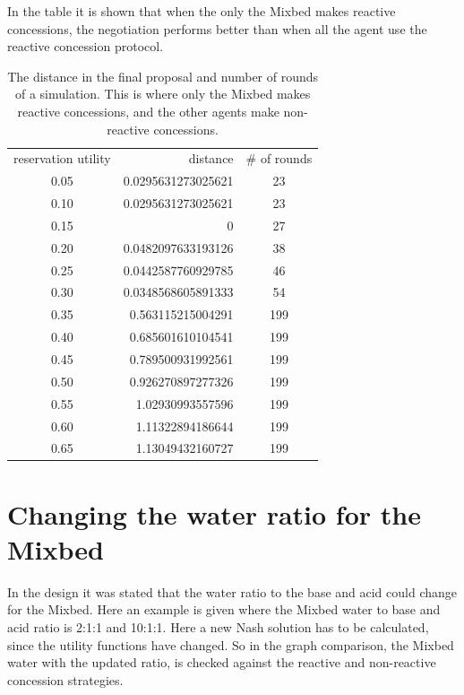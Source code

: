 In the table it is shown that when the only the Mixbed makes reactive concessions, the negotiation performs better than when all the agent use the reactive concession protocol. 
\begin{table}[h]
	\centering
\begin{tabular}{c n{1}{4} c }
	\toprule 
	reservation utility	& {distance} & \# of rounds \\ 
	\cmidrule(r){1-1}
	\cmidrule(r){2-3}
	 
	0.05&	0.0295631273025621	&23\\
	0.10&	0.0295631273025621	&23\\
	0.15&	0	&27\\
	0.20&	0.0482097633193126	&38\\
	0.25&	0.0442587760929785	&46\\
	0.30&	0.0348568605891333	&54\\
	0.35&	0.563115215004291	&199\\
	0.40&	0.685601610104541	&199\\
	0.45&	0.789500931992561	&199\\
	0.50&	0.926270897277326	&199\\
	0.55&	1.02930993557596	&199\\
	0.60&	1.11322894186644	&199\\
	0.65&	1.13049432160727	&199\\
	\bottomrule
\end{tabular} 
\caption{The distance in the final proposal and number of rounds of a simulation. This is where only the Mixbed makes reactive concessions, and the other agents make non-reactive concessions. }
\label{tab:reactivevsnon-reactivevsMixbedrea}
\end{table}
\npnoround

\clearpage
\section{Changing the water ratio for the Mixbed}
In the design it was stated that the water ratio to the base and acid could change for the Mixbed. Here an example is given where the Mixbed water to base and acid ratio is 2:1:1 and 10:1:1. Here a new Nash solution has to be calculated, since the utility functions have changed. So in the graph comparison, the Mixbed water with the updated ratio, is checked against the reactive and non-reactive concession strategies. 

